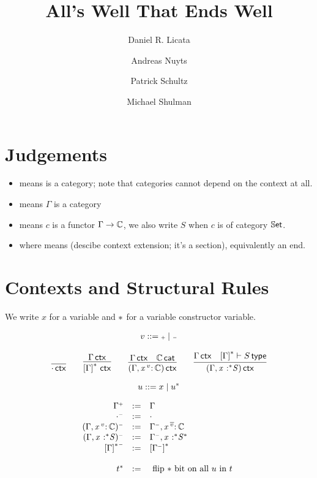 \documentclass[11pt]{article}
\title{All's Well That Ends Well}
\author{Daniel R. Licata \and Andreas Nuyts \and Patrick Schultz \and Michael Shulman}
\theoremstyle{plain}
\begin{document}
\maketitle

\section{Judgements}

\begin{itemize}

\item \wfdtp{\C} means \C\/ is a category; note that categories cannot
  depend on the context at all.  

\item \wfctx{\G} means $\Gamma$ is a category

\item {} means $c$ is a functor
  ${\Gamma} \to \mathbb{C}$, we also write $S$ when $c$ is of category $\mathbb{S}\mathsf{et}$.  

\item {} where
   means (descibe context
  extension; it's a section), equivalently an end.

\end{itemize}

\section{Contexts and Structural Rules}

We write $x$ for a variable and ${\mathord{*}}$\/ for a variable constructor
variable.  

\[
\begin{array}{l}
v ::= {\text{\tiny $\mathord{+}$}} \mid {\text{\tiny $\mathord{-}$}} \\
\end{array}
\]

\[
\begin{array}{c}
\infer{\wfctx{\cdot}}{} 
\qquad
\infer{\wfctx{\dupctx{\Gamma}{\vcond}}}
      {\wfctx{\Gamma}
      } 
\qquad
\infer{\wfctx{(\Gamma,\vtptm{x}{v}{\C})}}
      {\wfctx{\Gamma} & 
       \wfdtp{\C}
      } 
\qquad
\infer{\wfctx{(\Gamma,\tptmv{x}{\vcond}{S})}}
      {\wfctx{\Gamma} & 
        \wftp{\dupctx{\Gamma}{\vcond}}{S}
      } 
\end{array}
\]

\[
u ::= x \mid u^{{\mathord{*}}} \\
\]

\[
\begin{array}{rcl}
\Gamma^{{\text{\tiny $\mathord{+}$}}} & := & \Gamma \\
\cdot^{{\text{\tiny $\mathord{-}$}}} & := & \cdot \\
({\Gamma},\mathit{x} \,^{v}{:}^{\,} \mathit{\mathbb{C}})^{{\text{\tiny $\mathord{-}$}}} & := & {\Gamma^{{\text{\tiny $\mathord{-}$}}}},\mathit{x} \,^{\overline{v}}{:}^{\,} \mathit{\mathbb{C}} \\
({\Gamma},\mathit{x} \,^{\,}{:}^{{\mathord{*}}} \mathit{S})^{{\text{\tiny $\mathord{-}$}}} & := & {\Gamma^{{\text{\tiny $\mathord{-}$}}}},\mathit{x} \,^{\,}{:}^{{\mathord{*}}} \mathit{S^{{\mathord{*}}}} \\
{\left[\Gamma\right]^{{\mathord{*}}}}^{{\text{\tiny $\mathord{-}$}}} & := & \left[{\Gamma^{{\text{\tiny $\mathord{-}$}}}}\right]^{{{\mathord{*}}}} \\
\\ 
t^{{\mathord{*}}} & := & \text{ flip ${\mathord{*}}$ bit on all $u$ in $t$ } \\
\end{array}
\]
\end{document}
